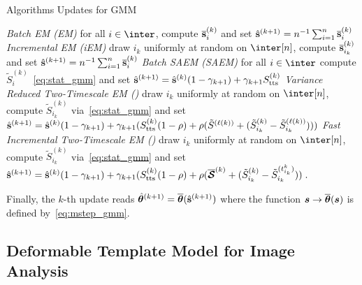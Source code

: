 \documentclass[12pt]{article}
\begin{document}
 \begin{protocol}[H]
\caption{Algorithms Updates for GMM}\label{alg:estepgmm}
  \begin{algorithmic}[1]
\STATE \textit{Batch EM (EM)} \hspace{0.4cm} for all $i \in \inter$, compute $\overline{{\mathbf{s}}}_{i}^{(k)}$ and set $\hat{{\mathbf{s}}}^{(k+1)} = n^{-1} \sum\nolimits_{i=1}^n \overline{{\mathbf{s}}}_i^{(k)}$
\STATE \textit{Incremental EM (iEM)} \hspace{0.4cm} draw  $i_k$ uniformly at random on $\inter[n]$, compute $\overline{{\mathbf{s}}}_{i_k}^{(k)}$ and set $\hat{{\mathbf{s}}}^{(k+1)} = n^{-1} \sum\nolimits_{i=1}^n \overline{{\mathbf{s}}}_i^{(k)}$
\STATE \textit{Batch SAEM (SAEM)} \hspace{0.4cm} for all $i \in \inter$ compute $ \tilde{S}_{i}^{(k)}$~\eqref{eq:stat_gmm} and set  $\hat{{\mathbf{s}}}^{(k+1)} = \hat{{\mathbf{s}}}^{(k)}(1 - \gamma_{k+1}) + \gamma_{k+1}S_{\textrm{tts}}^{(k)}$
\STATE \textit{Variance Reduced Two-Timescale EM (\SAEMVR)} \hspace{0.4cm} draw  $i_k$ uniformly at random on $\inter[n]$, compute $ \tilde{S}_{i_k}^{(k)}$ via~\eqref{eq:stat_gmm} and set $\hat{{\mathbf{s}}}^{(k+1)} = \hat{{\mathbf{s}}}^{(k)}(1 - \gamma_{k+1})+ \gamma_{k+1} (S_{\textrm{tts}}^{(k)} (1 - \rho) + \rho (\tilde{S}^{(\ell(k))} +  ( \tilde{S}_{i_k}^{(k)}  -\tilde{S}_{i_k}^{(\ell(k))}   )) ) $
\STATE \textit{Fast Incremental Two-Timescale EM (\FISAEM)} \hspace{0.4cm} draw  $i_k$ uniformly at random on $\inter[n]$, compute $ \tilde{S}_{i_k}^{(k)}$ via~\eqref{eq:stat_gmm} and set $ \hat{{\mathbf{s}}}^{(k+1)} = \hat{{\mathbf{s}}}^{(k)}(1 - \gamma_{k+1})+ \gamma_{k+1} (S_{\textrm{tts}}^{(k)} (1 - \rho) + \rho (\overline{{\bm{\mathcal{S}}}}^{(k)} + ( \tilde{S}_{i_k}^{(k)}  - \tilde{S}_{i_k}^{(t_{i_k}^k)}) ) \;.$
  \end{algorithmic}
\end{protocol}


Finally, the $k$-th update reads $\hat{{\bm{\theta}}}^{(k+1)} = \overline{{\bm{\theta}}} (\hat{{\mathbf{s}}}^{(k+1)})$ where the function ${\bm s} \to \overline{{\bm{\theta}}}({\bm s})$ is defined by~\eqref{eq:mstep_gmm}.


\subsection{Deformable Template Model for Image Analysis}
\end{document}
